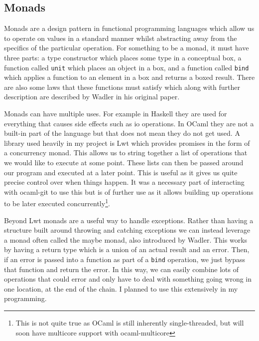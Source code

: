 \subsection{Monads}

Monads are a design pattern in functional programming languages which allow us to operate on values in a standard manner whilst abstracting away from the specifics of the particular operation. For something to be a monad, it must have three parts: a type constructor which places some type in a conceptual box, a function called \texttt{unit} which places an object in a box, and a function called \texttt{bind} which applies a function to an element in a box and returns a boxed result. There are also some laws that these functions must satisfy which along with further description are described by Wadler in his original paper\cite{wadler90monads}.

Monads can have multiple uses. For example in Haskell they are used for everything that causes side effects such as io operations. In OCaml they are not a built-in part of the language but that does not mean they do not get used. A library used heavily in my project is Lwt\cite{code_lwt} which provides promises in the form of a concurrency monad. This allows us to string together a list of operations that we would like to execute at some point. These lists can then be passed around our program and executed at a later point. This is useful as it gives us quite precise control over when things happen. It was a necessary part of interacting with ocaml-git to use this but is of further use as it allows building up operations to be later executed concurrently\footnote{This is not quite true as OCaml is still inherently single-threaded, but will soon have multicore support with ocaml-multicore\cite{dolan2014multicore}}.

Beyond Lwt monads are a useful way to handle exceptions. Rather than having a structure built around throwing and catching exceptions we can instead leverage a monad often called the maybe monad, also introduced by Wadler\cite{wadler90monads}. This works by having a return type which is a union of an actual result and an error. Then, if an error is passed into a function as part of a \texttt{bind} operation, we just bypass that function and return the error. In this way, we can easily combine lots of operations that could error and only have to deal with something going wrong in one location, at the end of the chain. I planned to use this extensively in my programming.

